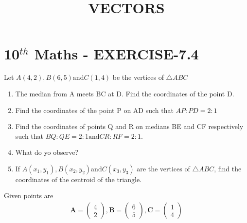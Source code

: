 \documentclass[12pt]{article}
\newcommand{\myvec}[1]{\ensuremath{\begin{pmatrix}#1\end{pmatrix}}}
\let\vec\mathbf
\begin{document}
\begin{center}
\title{\textbf{VECTORS}}
\date{\vspace{-5ex}} %
\maketitle
\end{center}

\section{10$^{th}$ Maths - EXERCISE-7.4}

Let $A (4, 2), B(6, 5) \text{and} C(1, 4)$ be the vertices of $\triangle ABC$
\begin{enumerate}
\item The median from A meets BC at D. Find the coordinates of the point D.
\item Find the coordinates of the point P on AD such that $AP : PD = 2 : 1$
\item Find the coordinates of points Q and R on medians BE and CF respectively such
that $BQ : QE = 2 : 1 \text{and} CR : RF = 2 : 1.$
\item What do yo observe?
\item If $A(x_1, y_1), B(x_2, y_2) \text{and} C(x_3, y_3)$ are the vertices of $\triangle ABC$, find the coordinates of the centroid of the triangle.
\end{enumerate}

Given points are
\begin{align}
\vec{A}=\myvec{4\\ 2} ,
\vec{B}=\myvec{6\\ 5} ,
\vec{C}=\myvec{1\\ 4}
\end{align}
\end{document}
